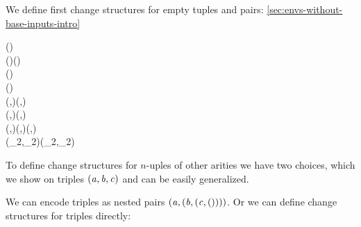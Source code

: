 We define first change structures for empty tuples and pairs:
\cref{sec:envs-without-base-inputs-intro}
\begin{hscode}\SaveRestoreHook
{}%
%
%
\>[B]{}\;\;()\;\<[E]%
\\
\>[B]{}\<[3]%
\>[3]{}\;\Delta ()\mathrel{=}(){}\<[E]%
\\
\>[B]{}\<[3]%
\>[3]{}\text{\textunderscore}\oplus \text{\textunderscore}\mathrel{=}(){}\<[E]%
\\
\>[B]{}\<[3]%
\>[3]{}\;\text{\textunderscore}\mathrel{=}(){}\<[E]%
\\
\>[B]{}\;(\;,\;)\Rightarrow{}\;(,)\;\<[E]%
\\
\>[B]{}\<[3]%
\>[3]{}\;\Delta (,)\mathrel{=}(\Delta {},\Delta {}){}\<[E]%
\\
\>[B]{}\<[3]%
\>[3]{}(,)\oplus (,)\mathrel{=}(\oplus {},\oplus {}){}\<[E]%
\\
\>[B]{}\<[3]%
\>[3]{}\;(_{2},_{2})\mathrel{=}(\;_{2},\;_{2}){}\<[E]%
\ColumnHook
\end{hscode}\resethooks

To define change structures for $n$-uples of other arities we have two choices,
which we show on triples \ensuremath{(\Varid{a},\Varid{b},\Varid{c})} and can be easily generalized.

We can encode triples as nested pairs \ensuremath{(\Varid{a},(\Varid{b},(\Varid{c},())))}. Or we can define
change structures for triples directly:

